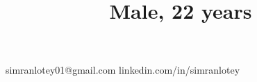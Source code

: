 \title{\normalsize Male, 22 years}

\address
    {H.No. 235, Street No. 5, Bachittar Nagar, Gill Road Ludhiana - 141006, Punjab, India}

\address
    {\#235, Street No. 5, Bachittar Nagar, Gill Road, Ludhiana - 141006, Punjab, India}
\email
    {simranlotey01@gmail.com}
\homepage
    {linkedin.com/in/simranlotey}
